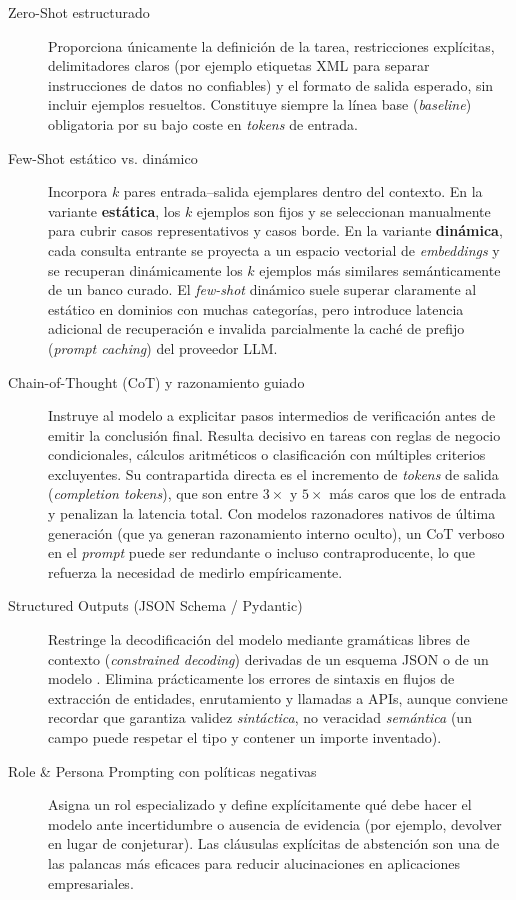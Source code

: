 \begin{description}
  \item[Zero-Shot estructurado] Proporciona únicamente la definición de la tarea, restricciones explícitas, delimitadores claros (por ejemplo etiquetas XML  para separar instrucciones de datos no confiables) y el formato de salida esperado, sin incluir ejemplos resueltos. Constituye siempre la línea base (\textit{baseline}) obligatoria por su bajo coste en \textit{tokens} de entrada.
  \item[Few-Shot estático vs. dinámico] Incorpora $k$ pares entrada--salida ejemplares dentro del contexto. En la variante \textbf{estática}, los $k$ ejemplos son fijos y se seleccionan manualmente para cubrir casos representativos y casos borde. En la variante \textbf{dinámica}, cada consulta entrante se proyecta a un espacio vectorial de \textit{embeddings} y se recuperan dinámicamente los $k$ ejemplos más similares semánticamente de un banco curado. El \textit{few-shot} dinámico suele superar claramente al estático en dominios con muchas categorías, pero introduce latencia adicional de recuperación e invalida parcialmente la caché de prefijo (\textit{prompt caching}) del proveedor LLM.
  \item[Chain-of-Thought (CoT) y razonamiento guiado] Instruye al modelo a explicitar pasos intermedios de verificación antes de emitir la conclusión final. Resulta decisivo en tareas con reglas de negocio condicionales, cálculos aritméticos o clasificación con múltiples criterios excluyentes. Su contrapartida directa es el incremento de \textit{tokens} de salida (\textit{completion tokens}), que son entre $3\times$ y $5\times$ más caros que los de entrada y penalizan la latencia total. Con modelos razonadores nativos de última generación (que ya generan razonamiento interno oculto), un CoT verboso en el \textit{prompt} puede ser redundante o incluso contraproducente, lo que refuerza la necesidad de medirlo empíricamente.
  \item[Structured Outputs (JSON Schema / Pydantic)] Restringe la decodificación del modelo mediante gramáticas libres de contexto (\textit{constrained decoding}) derivadas de un esquema JSON o de un modelo . Elimina prácticamente los errores de sintaxis en flujos de extracción de entidades, enrutamiento y llamadas a APIs, aunque conviene recordar que garantiza validez \emph{sintáctica}, no veracidad \emph{semántica} (un campo puede respetar el tipo  y contener un importe inventado).
  \item[Role \& Persona Prompting con políticas negativas] Asigna un rol especializado y define explícitamente qué debe hacer el modelo ante incertidumbre o ausencia de evidencia (por ejemplo, devolver  en lugar de conjeturar). Las cláusulas explícitas de abstención son una de las palancas más eficaces para reducir alucinaciones en aplicaciones empresariales.

\end{description}
